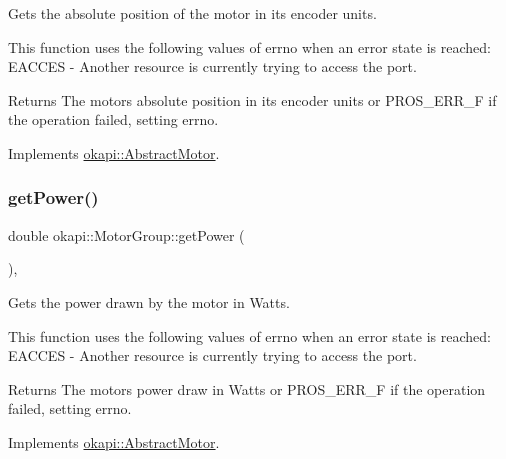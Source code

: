 Gets the absolute position of the motor in its encoder units.

This function uses the following values of errno when an error state is reached\+: E\+A\+C\+C\+ES -\/ Another resource is currently trying to access the port.

\begin{DoxyReturn}{Returns}
The motor\textquotesingle{}s absolute position in its encoder units or {\ttfamily P\+R\+O\+S\+\_\+\+E\+R\+R\+\_\+F} if the operation failed, setting errno. 
\end{DoxyReturn}


Implements \mbox{\hyperlink{classokapi_1_1AbstractMotor_a4f9d74e054600c5ddb49ebb8164004d3}{okapi\+::\+Abstract\+Motor}}.

\mbox{\label{classokapi_1_1MotorGroup_a67bdc04d59ba8293ccd58d26b849c9f0}} 
\subsubsection{\texorpdfstring{getPower()}{getPower()}}
{\footnotesize\ttfamily double okapi\+::\+Motor\+Group\+::get\+Power (\begin{DoxyParamCaption}{ }\end{DoxyParamCaption})\hspace{0.3cm}{\ttfamily [override]}, {\ttfamily [virtual]}}

Gets the power drawn by the motor in Watts.

This function uses the following values of errno when an error state is reached\+: E\+A\+C\+C\+ES -\/ Another resource is currently trying to access the port.

\begin{DoxyReturn}{Returns}
The motor\textquotesingle{}s power draw in Watts or {\ttfamily P\+R\+O\+S\+\_\+\+E\+R\+R\+\_\+F} if the operation failed, setting errno. 
\end{DoxyReturn}


Implements \mbox{\hyperlink{classokapi_1_1AbstractMotor_aed423ac40cec85c5880f7954b6d810fe}{okapi\+::\+Abstract\+Motor}}.

\mbox{\label{classokapi_1_1MotorGroup_ac7d9b049f24ddc141b2b63f7e3e4d3ba}} 
